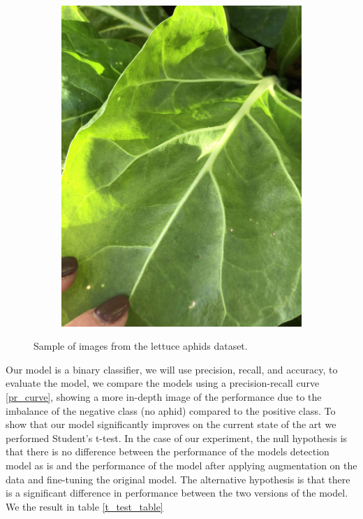 \documentclass{article}
\begin{document}
\begin{figure}
\begin{subfigure}{0.4\textwidth}
        \includegraphics[width=\textwidth]{images/ds4.jpg}
    \end{subfigure}
    \caption{Sample of images from the lettuce aphids dataset.}
    \label{fig:dataset}
\end{figure}

Our model is a binary classifier, we will use precision, recall, and accuracy, to evaluate the model, we compare the models using a precision-recall curve \ref{pr_curve},
showing a more in-depth image of the performance due to the imbalance of the negative class (no aphid) compared to the positive class.
To show that our model significantly improves on the current state of the art we performed Student’s t-test. 
In the case of our experiment, the null hypothesis is that there is no difference between the performance of the models 
detection model as is and the performance of the model after applying augmentation on the data and fine-tuning the original model. 
The alternative hypothesis is that there is a significant difference in performance between the two versions of the model.
We the result in table \ref{t_test_table}
\end{document}
